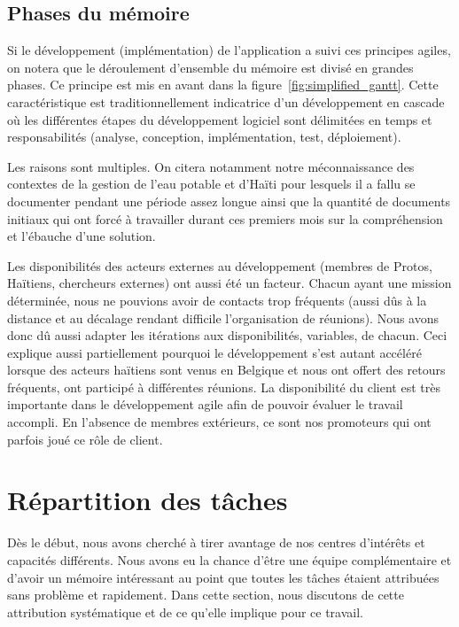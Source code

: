 \documentclass{EPL-master-thesis-covers-FR}
\begin{document}
			\subsection*{Phases du mémoire}

				Si le développement (implémentation) de l'application a suivi ces principes agiles, on notera que le déroulement d'ensemble du mémoire est divisé en grandes phases. Ce principe est mis en avant dans la figure~\ref{fig:simplified_gantt}. Cette caractéristique est traditionnellement indicatrice d'un développement en cascade où les différentes étapes du développement logiciel sont délimitées en temps et responsabilités (analyse, conception, implémentation, test, déploiement).

				Les raisons sont multiples. On citera notamment notre méconnaissance des contextes de la gestion de l'eau potable et d'Haïti pour lesquels il a fallu se documenter pendant une période assez longue ainsi que la quantité de documents initiaux qui ont forcé à travailler durant ces premiers mois sur la compréhension et l'ébauche d'une solution.

				Les disponibilités des acteurs externes au développement (membres de Protos, Haïtiens, chercheurs externes) ont aussi été un facteur. Chacun ayant une mission déterminée, nous ne pouvions avoir de contacts trop fréquents (aussi dûs à la distance et au décalage rendant difficile l'organisation de réunions). Nous avons donc dû aussi adapter les itérations aux disponibilités, variables, de chacun. Ceci explique aussi partiellement pourquoi le développement s'est autant accéléré lorsque des acteurs haïtiens sont venus en Belgique et nous ont offert des retours fréquents, ont participé à différentes réunions. La disponibilité du client est très importante dans le développement agile afin de pouvoir évaluer le travail accompli. En l'absence de membres extérieurs, ce sont nos promoteurs qui ont parfois joué ce rôle de client.

		\section{Répartition des tâches}

			Dès le début, nous avons cherché à tirer avantage de nos centres d'intérêts et capacités différents. Nous avons eu la chance d'être une équipe complémentaire et d'avoir un mémoire intéressant au point que toutes les tâches étaient attribuées sans problème et rapidement. Dans cette section, nous discutons de cette attribution systématique et de ce qu'elle implique pour ce travail.
\end{document}
